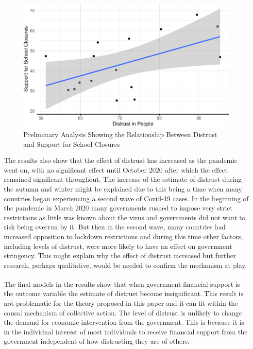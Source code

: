 \documentclass[
  12pt,
]{article}
\begin{document}
\begin{figure}
\includegraphics[width=0.8\linewidth]{write_up_test_files/figure-latex/yougov-1} \caption{Preliminary Analysis Showing the Relationship Between Distrust and Support for School Closures}\label{fig:yougov}
\end{figure}

\hfill\break
The results also show that the effect of distrust has increased as the pandemic went on, with no significant effect until October 2020 after which the effect remained significant throughout. The increase of the estimate of distrust during the autumn and winter might be explained due to this being a time when many countries began experiencing a second wave of Covid-19 cases. In the beginning of the pandemic in March 2020 many governments rushed to impose very strict restrictions as little was known about the virus and governments did not want to risk being overrun by it. But then in the second wave, many countries had increased opposition to lockdown restrictions and during this time other factors, including levels of distrust, were more likely to have an effect on government stringency. This might explain why the effect of distrust increased but further research, perhaps qualitative, would be needed to confirm the mechanism at play.\\
~\\
The final models in the results show that when government financial support is the outcome variable the estimate of distrust become insignificant. This result is not problematic for the theory proposed in this paper and it can fit within the causal mechanism of collective action. The level of distrust is unlikely to change the demand for economic intervention from the government. This is because it is in the individual interest of most individuals to receive financial support from the government independent of how distrusting they are of others.\\
\end{document}
